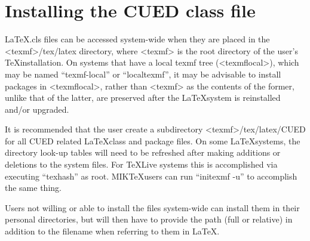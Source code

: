 
\chapter{Installing the CUED class file}

\LaTeX.cls files can be accessed system-wide when they are placed in the
<texmf>/tex/latex directory, where <texmf> is the root directory of the user’s \TeX installation. On systems that have a local texmf tree (<texmflocal>), which
may be named ``texmf-local'' or ``localtexmf'', it may be advisable to install packages in <texmflocal>, rather than <texmf> as the contents of the former, unlike that of the latter, are preserved after the \LaTeX system is reinstalled and/or upgraded.

It is recommended that the user create a subdirectory <texmf>/tex/latex/CUED for all CUED related \LaTeX class and package files. On some \LaTeX systems, the directory look-up tables will need to be refreshed after making additions or deletions to the system files. For \TeX Live systems this is accomplished via executing ``texhash'' as root. MIK\TeX users can run ``initexmf -u'' to accomplish the same thing.

Users not willing or able to install the files system-wide can install them in their personal directories, but will then have to provide the path (full or relative) in addition to the filename when referring to them in \LaTeX.

